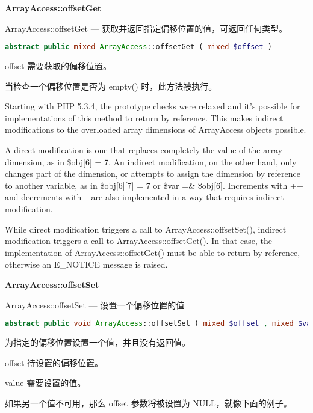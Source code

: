 \textbf{ArrayAccess::offsetGet}

ArrayAccess::offsetGet — 获取并返回指定偏移位置的值，可返回任何类型。

\begin{lstlisting}[language=PHP]
abstract public mixed ArrayAccess::offsetGet ( mixed $offset )
\end{lstlisting}

\begin{compactitem}
\item offset
需要获取的偏移位置。
\end{compactitem}

当检查一个偏移位置是否为 empty() 时，此方法被执行。


Starting with PHP 5.3.4, the prototype checks were relaxed and it's possible for implementations of this method to return by reference. This makes indirect modifications to the overloaded array dimensions of ArrayAccess objects possible.

A direct modification is one that replaces completely the value of the array dimension, as in \$obj[6] = 7. An indirect modification, on the other hand, only changes part of the dimension, or attempts to assign the dimension by reference to another variable, as in \$obj[6][7] = 7 or \$var =\& \$obj[6]. Increments with ++ and decrements with -- are also implemented in a way that requires indirect modification.

While direct modification triggers a call to ArrayAccess::offsetSet(), indirect modification triggers a call to ArrayAccess::offsetGet(). In that case, the implementation of ArrayAccess::offsetGet() must be able to return by reference, otherwise an E\_NOTICE message is raised.


\textbf{ArrayAccess::offsetSet}

ArrayAccess::offsetSet — 设置一个偏移位置的值


\begin{lstlisting}[language=PHP]
abstract public void ArrayAccess::offsetSet ( mixed $offset , mixed $value )
\end{lstlisting}

为指定的偏移位置设置一个值，并且没有返回值。


\begin{compactitem}
\item offset
待设置的偏移位置。
\item value
需要设置的值。
\end{compactitem}

如果另一个值不可用，那么 offset 参数将被设置为 NULL，就像下面的例子。

